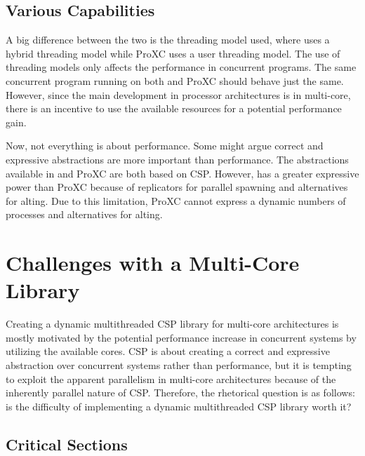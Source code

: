 \section{Various Capabilities}


A big difference between the two is the threading model used, where \Proxc{} uses a hybrid threading model while ProXC uses a user threading model. The use of threading models only affects the performance in concurrent programs. The same concurrent program running on both \Proxc{} and ProXC should behave just the same. However, since the main development in processor architectures is in multi\hyp{}core, there is an incentive to use the available resources for a potential performance gain.

Now, not everything is about performance. Some might argue correct and expressive abstractions are more important than performance. The abstractions available in \Proxc{} and ProXC are both based on CSP. However, \Proxc{} has a greater expressive power than ProXC because of replicators for parallel spawning and alternatives for alting. Due to this limitation, ProXC cannot express a dynamic numbers of processes and alternatives for alting.


\chapter{Challenges with a Multi\hyp{}Core Library}
\label{ch:difficulty_multicore_csp}

Creating a dynamic multithreaded CSP library for multi\hyp{}core architectures is mostly motivated by the potential performance increase in concurrent systems by utilizing the available cores. CSP is about creating a correct and expressive abstraction over concurrent systems rather than performance, but it is tempting to exploit the apparent parallelism in multi\hyp{}core architectures because of the inherently parallel nature of CSP. Therefore, the rhetorical question is as follows: is the difficulty of implementing a dynamic multithreaded CSP library worth it?


\section{Critical Sections}


